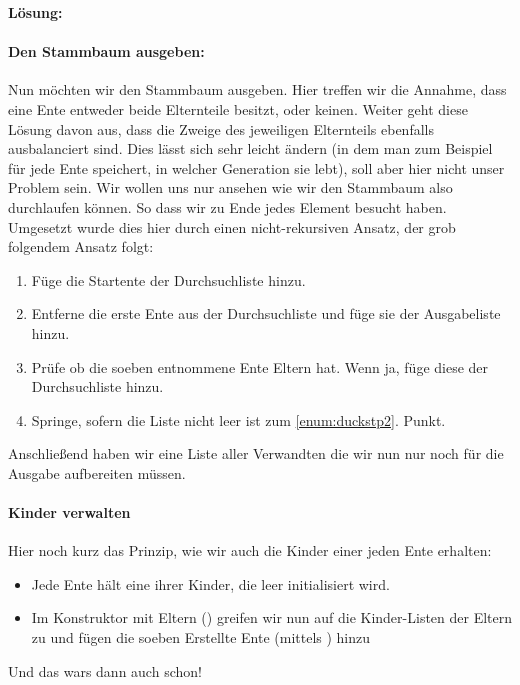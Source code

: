 \documentclass[table]{sopra-base}
\makeatletter
\newenvironment{solution}{\null\par\noindent\textbf{\textcolor{sob@col@uulm@cs}{Lösung:}}\newline\bgroup\color{black}\slshape\ignorespaces}{\egroup}
\makeatother
\begin{document}
\begin{solution}
        \paragraph{Den Stammbaum ausgeben:}
        Nun möchten wir den Stammbaum ausgeben. Hier treffen wir die Annahme, dass eine Ente entweder beide Elternteile besitzt, oder keinen. Weiter geht diese Lösung davon aus, dass die Zweige des jeweiligen Elternteils ebenfalls ausbalanciert sind. Dies lässt sich sehr leicht ändern (in dem man zum Beispiel für jede Ente speichert, in welcher Generation sie lebt), soll aber hier nicht unser Problem sein. Wir wollen uns nur ansehen wie wir den Stammbaum  also durchlaufen können. So dass wir zu Ende jedes Element besucht haben. Umgesetzt wurde dies hier durch einen nicht-rekursiven Ansatz, der grob folgendem Ansatz folgt:
        \begin{enumerate}[nolistsep]
            \item Füge die Startente der Durchsuchliste hinzu.
            \item \label{enum:duckstp2}Entferne die erste Ente aus der Durchsuchliste und füge sie der Ausgabeliste hinzu.
            \item Prüfe ob die soeben entnommene Ente Eltern hat. Wenn ja, füge diese der Durchsuchliste hinzu.
            \item Springe, sofern die Liste nicht leer ist zum \ref{enum:duckstp2}. Punkt.
        \end{enumerate}
        Anschließend haben wir eine Liste aller Verwandten die wir nun nur noch für die Ausgabe aufbereiten müssen. 
        \paragraph{Kinder verwalten}
        Hier noch kurz das Prinzip, wie wir auch die Kinder einer jeden Ente erhalten:
        \begin{itemize}[nolistsep]
            \item Jede Ente hält eine  ihrer Kinder, die leer initialisiert wird.
            \item Im Konstruktor mit Eltern () greifen wir nun auf die Kinder-Listen der Eltern zu und fügen die soeben Erstellte Ente (mittels ) hinzu
        \end{itemize}
        Und das wars dann auch schon!
    \egroup
\end{solution}
\end{document}
